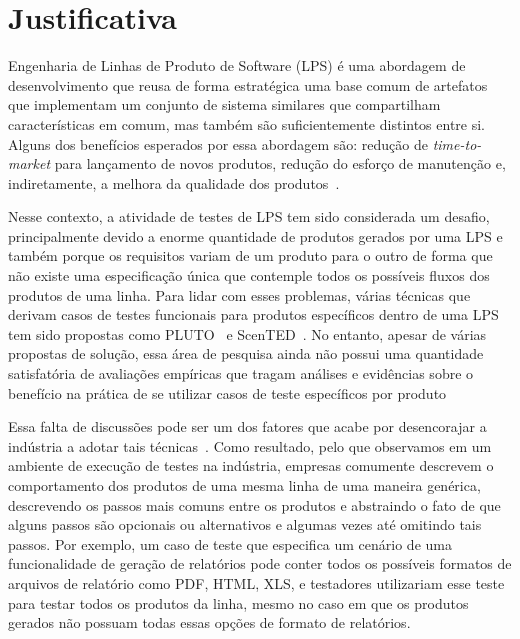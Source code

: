 \section{Justificativa}

\label{sec:justificativa}


Engenharia de Linhas de Produto de Software (LPS) é uma abordagem de
desenvolvimento que reusa de forma estratégica uma base comum de artefatos que
implementam um conjunto de sistema similares que compartilham características em
comum, mas também são suficientemente distintos entre si. Alguns dos benefícios
esperados por essa abordagem são: redução de \emph{time-to-market} para
lançamento de novos produtos, redução do esforço de manutenção e,
indiretamente, a melhora da qualidade dos produtos~\cite{pohl-book}.

Nesse contexto, a atividade de testes de LPS tem sido considerada um desafio,
principalmente devido a enorme quantidade de produtos gerados por uma LPS e
também porque os requisitos variam de um produto para o outro de forma que não
existe uma especificação única que contemple todos os possíveis fluxos dos
produtos de uma linha. Para lidar com esses problemas, várias técnicas que
derivam casos de testes funcionais para produtos específicos dentro de uma LPS
tem sido propostas como PLUTO~\cite{Bertolino:pluto} e
ScenTED~\cite{Pohl:scented}. No entanto, apesar de várias propostas de solução, 
essa área de pesquisa ainda não possui uma quantidade satisfatória de avaliações
empíricas que tragam análises e evidências sobre o benefício na prática de se
utilizar casos de teste específicos por produto

Essa falta de discussões pode ser um dos fatores que acabe por desencorajar a
indústria a adotar tais técnicas~\cite{Tevanlinna:spltesting, Engstrom2011}.
Como resultado, pelo que observamos em um ambiente de execução de testes na
indústria, empresas comumente descrevem o comportamento dos produtos de uma
mesma linha de uma maneira genérica, descrevendo os passos mais comuns entre os
produtos e abstraindo o fato de que alguns passos são opcionais ou alternativos
e algumas vezes até omitindo tais passos. Por exemplo, um caso de teste que
especifica um cenário de uma funcionalidade de geração de relatórios pode conter
todos os possíveis formatos de arquivos de relatório como PDF, HTML, XLS, e
testadores utilizariam esse teste para testar todos os produtos da linha, mesmo
no caso em que os produtos gerados não possuam todas essas opções de formato de
relatórios. 

